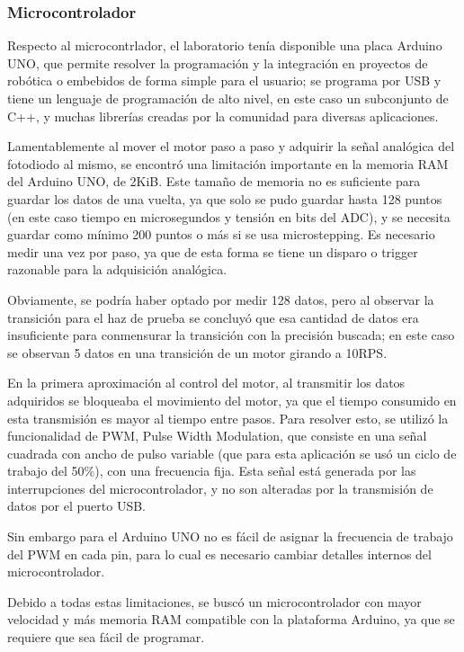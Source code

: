 \subsubsection{Microcontrolador}
Respecto al microcontrlador, el laboratorio tenía disponible una placa Arduino\cite{arduino} UNO, que permite resolver la programación y la integración en proyectos de robótica o embebidos de forma simple para el usuario; se programa por USB y tiene un lenguaje de programación de alto nivel, en este caso un subconjunto de C++, y muchas librerías creadas por la comunidad para diversas aplicaciones.

Lamentablemente al mover el motor paso a paso y adquirir la señal analógica del fotodiodo al mismo, se encontró una limitación importante en la memoria RAM del Arduino UNO, de 2KiB. Este tamaño de memoria no es suficiente para guardar los datos de una vuelta, ya que solo se pudo guardar hasta 128 puntos (en este caso tiempo en microsegundos y tensión en bits del ADC), y se necesita guardar como mínimo 200 puntos o más si se usa microstepping. Es necesario medir una vez por paso, ya que de esta forma se tiene un disparo o trigger razonable para la adquisición analógica. 

Obviamente, se podría haber optado por medir 128 datos, pero al observar la transición para el haz de prueba se concluyó que esa cantidad de datos era insuficiente para conmensurar la transición con la precisión buscada; en este caso se observan 5 datos en una transición de un motor girando a 10RPS.

En la primera aproximación al control del motor, al transmitir los datos adquiridos se bloqueaba el movimiento del motor, ya que el tiempo consumido en esta transmisión es mayor al tiempo entre pasos. Para resolver esto, se utilizó la funcionalidad de PWM, Pulse Width Modulation, que consiste en una señal cuadrada con ancho de pulso variable (que para esta aplicación se usó un ciclo de trabajo del 50\%), con una frecuencia fija. Esta señal está generada por las interrupciones del microcontrolador, y no son alteradas por la transmisión de datos por el puerto USB.

Sin embargo para el Arduino UNO no es fácil de asignar la frecuencia de trabajo del PWM en cada pin, para lo cual es necesario cambiar detalles internos del microcontrolador.

Debido a todas estas limitaciones, se buscó un microcontrolador con mayor velocidad y más memoria RAM compatible con la plataforma Arduino, ya que se requiere que sea fácil de programar.

